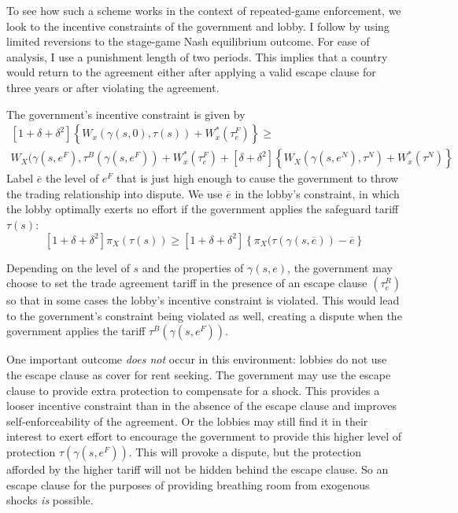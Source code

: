 \documentclass[12pt,titlepage]{article}
\newcommand{\ov}{\overline}
\newcommand{\ga}{\gamma}
\newcommand{\de}{\delta}
\begin{document}
To see how such a scheme works in the context of repeated-game enforcement, we look to the incentive constraints of the government and lobby. I follow \Textcite{buzard2013a} by using limited reversions to the stage-game Nash equilibrium outcome. For ease of analysis, I use a punishment length of two periods. This implies that a country would return to the agreement either after applying a valid escape clause for three years or after violating the agreement.

The government's incentive constraint is given by
  \begin{multline}
    \left[1+ \de +\de^2 \right] \left\{W_x(\ga(s,0),\tau(s)) + W_x^*(\tau_e^F) \right\} \geq \\ W_X(\ga(s,e^F),\tau^B(\ga(s,e^F)) + W_x^*(\tau_e^F) + \left[\de +\de^2 \right] \left\{W_X(\ga(s,e^N),\tau^N) + W_x^*(\tau^N) \right\}
		\label{exp:govincentEC}
  \end{multline}
Label $\ov{e}$ the level of $e^F$ that is just high enough to cause the government to throw the trading relationship into dispute. We use $\ov{e}$ in the lobby's constraint, in which the lobby optimally exerts no effort if the government applies the safeguard tariff $\tau(s)$:
\begin{equation}
  \left[1+ \de +\de^2 \right] \pi_X(\tau(s)) \geq \left[1+ \de +\de^2 \right] \left\{\pi_X(\tau(\ga(s,\ov{e})) - \ov{e} \right\}
	\label{exp:lobbyEC}
\end{equation}

Depending on the level of $s$ and the properties of $\ga(s,e)$, the government may choose to set the trade agreement tariff in the presence of an escape clause $\left(\tau_e^R\right)$ so that in some cases the lobby's incentive constraint is violated. This would lead to the government's constraint being violated as well, creating a dispute when the government applies the tariff $\tau^B(\ga(s,e^F))$. 

One important outcome \textit{does not} occur in this environment: lobbies do not use the escape clause as cover for rent seeking. The government may use the escape clause to provide extra protection to compensate for a shock. This provides a looser incentive constraint than in the absence of the escape clause and improves self-enforceability of the agreement. Or the lobbies may still find it in their interest to exert effort to encourage the government to provide this higher level of protection $\tau(\ga(s,e^F))$. This will provoke a dispute, but the protection afforded by the higher tariff will not be hidden behind the escape clause. So an escape clause for the purposes of providing breathing room from exogenous shocks \textit{is} possible.
\end{document}
